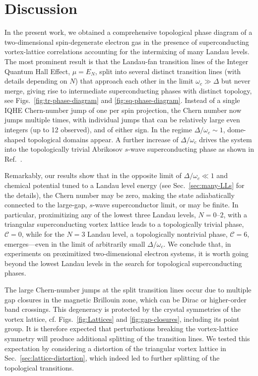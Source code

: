 \documentclass[10pt,prb,aps,superscriptaddress,amsmath,amssymb,twocolumn,floatfix,longbibliography]{revtex4-1}
\begin{document}
\section{Discussion}

In the present work, we obtained a comprehensive
topological phase diagram of a two-dimensional spin-degenerate electron gas in the presence of superconducting vortex-lattice correlations accounting for the intermixing of many Landau levels. The most prominent result is that the Landau-fan transition lines of the Integer Quantum Hall Effect, $\mu = E_N$, split into several distinct transition lines (with details depending on $N$) that approach each other in the limit $\omega_c \gg \Delta$ but never merge, giving rise to intermediate superconducting phases with distinct topology, see Figs.~\ref{fig:tr-phase-diagram} and \ref{fig:sq-phase-diagram}. Instead of a single IQHE Chern-number jump of one per spin projection, the Chern number now jumps multiple times, with individual jumps that can be relatively large even integers (up to 12 observed), and of either sign. In the regime $\Delta / \omega_c \sim 1$, dome-shaped topological domains appear. A further increase of $\Delta / \omega_c$ drives the system into the topologically trivial Abrikosov $s$-wave superconducting phase as  shown in Ref.~.

Remarkably, our results show that in the opposite limit of $\Delta/\omega_c \ll 1$ and chemical potential tuned to a Landau level energy (see Sec.~\ref{sec:many-LLs} for the details), the Chern number may be zero, making the state adiabatically connected to the large-gap, $s$-wave superconductor limit, or may be finite.
In particular, proximitizing any of the lowest three Landau levels, $N=0$--$2$, with a triangular superconducting vortex lattice leads to a topologically trivial phase, $\mathcal{C} = 0$, while for the $N = 3$ Landau level, a topologically nontrivial phase, $\mathcal{C} = 6$, emerges---even in the limit of arbitrarily small $\Delta/\omega_c$. We conclude that, in experiments on proximitized two-dimensional electron systems, it is worth going beyond the lowest Landau levels in the search for topological superconducting phases.


The large Chern-number jumps at the split transition lines occur due to multiple gap closures in the magnetic Brillouin zone, which can be Dirac or higher-order band crossings. This degeneracy is protected by the crystal symmetries of the vortex lattice, cf. Figs.~\ref{fig:Lattices} and \ref{fig:gap-closures}, including its point group. It is therefore expected that perturbations breaking the vortex-lattice symmetry will produce additional splitting of the transition lines. We tested this expectation by considering a distortion of the triangular vortex lattice in Sec.~\ref{sec:lattice-distortion}, which indeed led to further splitting of the topological transitions.
\end{document}
